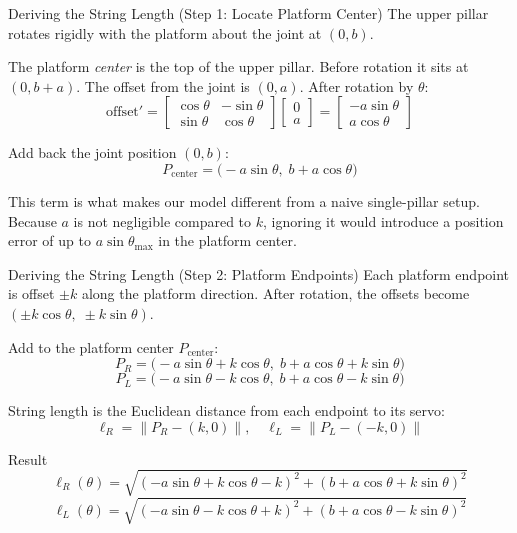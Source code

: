\documentclass[10pt]{beamer}
\begin{document}
\begin{frame}{Deriving the String Length (Step 1: Locate Platform Center)}
  The upper pillar rotates rigidly with the platform about the joint at $(0, b)$.

  The platform \emph{center} is the top of the upper pillar. Before rotation it sits at $(0, b+a)$. The offset from the joint is $(0, a)$. After rotation by $\theta$:
  \[
    \text{offset}' = \begin{bmatrix} \cos\theta & -\sin\theta \\ \sin\theta & \cos\theta \end{bmatrix} \begin{bmatrix} 0 \\ a \end{bmatrix}
    = \begin{bmatrix} -a\sin\theta \\ a\cos\theta \end{bmatrix}
  \]

  Add back the joint position $(0, b)$:
  \[
    \boxed{\;
      P_{\text{center}} = \bigl(-a\sin\theta,\; b + a\cos\theta\bigr)
    \;}
  \]

  \scriptsize
  This term is what makes our model different from a naive single-pillar setup. Because $a$ is not negligible compared to $k$, ignoring it would introduce a position error of up to $a\sin\theta_{\max}$ in the platform center.
\end{frame}

\begin{frame}{Deriving the String Length (Step 2: Platform Endpoints)}
  Each platform endpoint is offset $\pm k$ along the platform direction. After rotation, the offsets become $(\pm k\cos\theta,\; \pm k\sin\theta)$.

  Add to the platform center $P_{\text{center}}$:
  \[
    P_R = \bigl(-a\sin\theta + k\cos\theta,\; b + a\cos\theta + k\sin\theta\bigr)
  \]
  \[
    P_L = \bigl(-a\sin\theta - k\cos\theta,\; b + a\cos\theta - k\sin\theta\bigr)
  \]

  String length is the Euclidean distance from each endpoint to its servo:
  \[
    \ell_R = \|P_R - (k, 0)\|, \quad \ell_L = \|P_L - (-k, 0)\|
  \]

  \begin{block}{Result}
    \footnotesize
    \[
      \ell_R(\theta) = \sqrt{(-a\sin\theta + k\cos\theta - k)^2 + (b + a\cos\theta + k\sin\theta)^2}
    \]
    \[
      \ell_L(\theta) = \sqrt{(-a\sin\theta - k\cos\theta + k)^2 + (b + a\cos\theta - k\sin\theta)^2}
    \]
  \end{block}
\end{frame}
\end{document}
